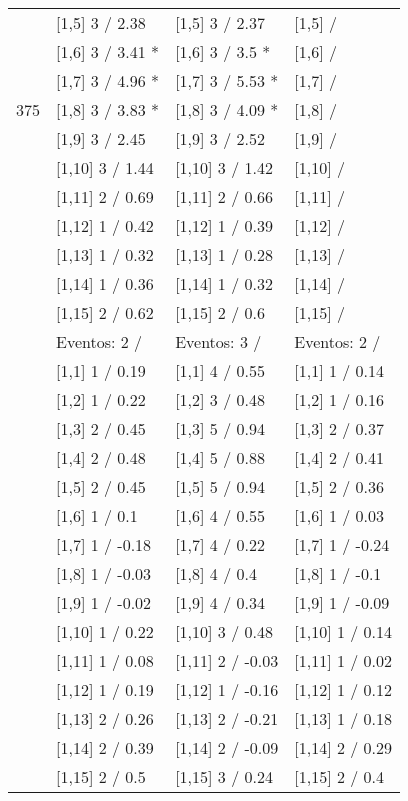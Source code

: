 \begin{table}
\begin{tabular}[t]{llll}
 & {}[1,5] 3  / 2.38 & {}[1,5] 3  / 2.37 & {}[1,5]  /\\
 & {}[1,6] 3  / 3.41 * & {}[1,6] 3  / 3.5 * & {}[1,6]  /\\
 & {}[1,7] 3  / 4.96 * & {}[1,7] 3  / 5.53 * & {}[1,7]  /\\
375 & {}[1,8] 3  / 3.83 * & {}[1,8] 3  / 4.09 * & {}[1,8]  /\\
\addlinespace
 & {}[1,9] 3  / 2.45 & {}[1,9] 3  / 2.52 & {}[1,9]  /\\
 & {}[1,10] 3  / 1.44 & {}[1,10] 3  / 1.42 & {}[1,10]  /\\
 & {}[1,11] 2  / 0.69 & {}[1,11] 2  / 0.66 & {}[1,11]  /\\
 & {}[1,12] 1  / 0.42 & {}[1,12] 1  / 0.39 & {}[1,12]  /\\
 & {}[1,13] 1  / 0.32 & {}[1,13] 1  / 0.28 & {}[1,13]  /\\
\addlinespace
 & {}[1,14] 1  / 0.36 & {}[1,14] 1  / 0.32 & {}[1,14]  /\\
 & {}[1,15] 2  / 0.62 & {}[1,15] 2  / 0.6 & {}[1,15]  /\\
 & Eventos:  2 / & Eventos:  3 / & Eventos:  2 /\\
 & {}[1,1] 1  / 0.19 & {}[1,1] 4  / 0.55 & {}[1,1] 1  / 0.14\\
 & {}[1,2] 1  / 0.22 & {}[1,2] 3  / 0.48 & {}[1,2] 1  / 0.16\\
\addlinespace
 & {}[1,3] 2  / 0.45 & {}[1,3] 5  / 0.94 & {}[1,3] 2  / 0.37\\
 & {}[1,4] 2  / 0.48 & {}[1,4] 5  / 0.88 & {}[1,4] 2  / 0.41\\
 & {}[1,5] 2  / 0.45 & {}[1,5] 5  / 0.94 & {}[1,5] 2  / 0.36\\
 & {}[1,6] 1  / 0.1 & {}[1,6] 4  / 0.55 & {}[1,6] 1  / 0.03\\
 & {}[1,7] 1  / -0.18 & {}[1,7] 4  / 0.22 & {}[1,7] 1  / -0.24\\
\addlinespace
500 & {}[1,8] 1  / -0.03 & {}[1,8] 4  / 0.4 & {}[1,8] 1  / -0.1\\
 & {}[1,9] 1  / -0.02 & {}[1,9] 4  / 0.34 & {}[1,9] 1  / -0.09\\
 & {}[1,10] 1  / 0.22 & {}[1,10] 3  / 0.48 & {}[1,10] 1  / 0.14\\
 & {}[1,11] 1  / 0.08 & {}[1,11] 2  / -0.03 & {}[1,11] 1  / 0.02\\
 & {}[1,12] 1  / 0.19 & {}[1,12] 1  / -0.16 & {}[1,12] 1  / 0.12\\
\addlinespace
 & {}[1,13] 2  / 0.26 & {}[1,13] 2  / -0.21 & {}[1,13] 1  / 0.18\\
 & {}[1,14] 2  / 0.39 & {}[1,14] 2  / -0.09 & {}[1,14] 2  / 0.29\\
 & {}[1,15] 2  / 0.5 & {}[1,15] 3  / 0.24 & {}[1,15] 2  / 0.4\\
\bottomrule
\end{tabular}
\end{table}
